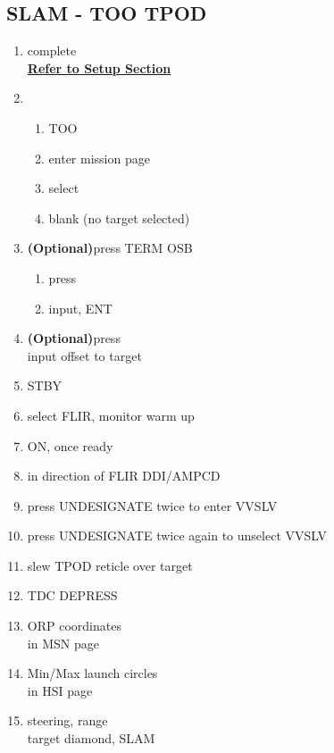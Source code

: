 \documentclass[fontHelvetica, widesubsec]{TechCheck}
\begin{document}
	\subsection{SLAM - TOO TPOD}
	\begin{enumerate}
		\item {}\dotfill complete \\
		\hfill \hyperref[subsec:84setup]{\textbf{Refer to Setup Section}}
		\item {}
		\begin{enumerate}
			\item {}\dotfill TOO
			\item {}\dotfill enter mission page
			\item {}\dotfill select
			\item {}\dotfill blank (no target selected)
		\end{enumerate}
		\item {} \textbf{(Optional)}\dotfill press TERM OSB
		\begin{enumerate}
			\item {}\dotfill press
			\item {}\dotfill input, ENT
		\end{enumerate}
		\item {} \textbf{(Optional)}\dotfill press \\
		\hfill input offset to target
		\item {}\dotfill STBY
		\item {}\dotfill select FLIR, monitor warm up
		\item {}\dotfill ON, once ready
		\item {}\dotfill in direction of FLIR DDI/AMPCD
		\item {}\dotfill press UNDESIGNATE twice to enter VVSLV
		\item {}\dotfill press UNDESIGNATE twice again to unselect VVSLV
		\item {}\dotfill slew TPOD reticle over target
		\item {}\dotfill TDC DEPRESS
		\item {}\dotfill ORP coordinates\\
		\hfill  in MSN page
		\item {}\dotfill Min/Max launch circles\\
		\hfill in HSI page
		\item {}\dotfill steering, range \\
		\hfill  target diamond, SLAM
	\end{enumerate}
\end{document}
